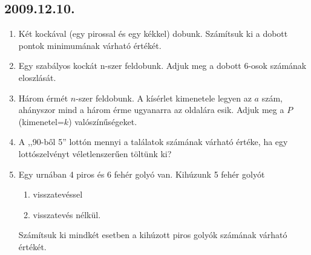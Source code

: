 \documentclass{article}
\newenvironment{abc}{\begin{enumerate}[label=\textit{\alph*})]}{\end{enumerate}}
\begin{document}
\subsection*{2009.12.10.}
\begin{enumerate}
\item Két kockával (egy pirossal és egy kékkel) dobunk. Számítsuk ki a dobott pontok minimumának várható értékét.
\item Egy szabályos kockát n-szer feldobunk. Adjuk meg a dobott 6-osok számának eloszlását.
\item Három érmét $n$-szer feldobunk. A kísérlet kimenetele legyen az $a$ szám, ahányszor mind a három érme ugyanarra az oldalára esik. Adjuk meg a $P$(kimenetel=$k$) valószínűségeket.
\item A ,,90-ből 5'' lottón mennyi a találatok számának várható értéke, ha egy lottószelvényt véletlenszerűen töltünk ki?
\item Egy urnában 4 piros és 6 fehér golyó van. Kihúzunk 5 fehér golyót
\begin{abc}
\item visszatevéssel
\item visszatevés nélkül.
\end{abc}
Számítsuk ki mindkét esetben a kihúzott piros golyók számának várható értékét.
\end{enumerate}

\newpage
\end{document}
